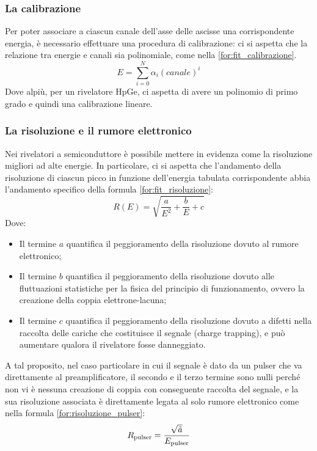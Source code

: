 \documentclass{article}
\begin{document}
            \subsubsection*{La calibrazione}
                Per poter associare a ciascun canale dell'asse delle ascisse una corrispondente energia, è necessario effettuare una procedura di calibrazione: ci si aspetta che la relazione tra energie e canali sia polinomiale, come nella \eqref{for:fit_calibrazione}.
                \begin{equation}\label{for:fit_calibrazione}
                    E=\sum_{i=0}^{N} \alpha_i(canale)^i
                \end{equation}
                Dove alpiù, per un rivelatore HpGe, ci aspetta di avere un polinomio di primo grado e quindi una calibrazione lineare.
                
            \subsubsection*{La risoluzione e il rumore elettronico}
                Nei rivelatori a semiconduttore è possibile mettere in evidenza come la risoluzione migliori ad alte energie. In particolare, ci si aspetta che l'andamento della risoluzione di ciascun picco in funzione dell'energia tabulata corrispondente abbia l'andamento specifico della formula \eqref{for:fit_risoluzione}:
                \begin{equation}\label{for:fit_risoluzione}
                    R(E)=\sqrt{\frac{a}{E^2}+\frac{b}{E}+c}
                \end{equation}
                Dove:
                \begin{itemize}
                    \item Il termine $a$ quantifica il peggioramento della risoluzione dovuto al rumore elettronico;
                    \item Il termine $b$ quantifica il peggioramento della risoluzione dovuto alle fluttuazioni statistiche per la fisica del principio di funzionamento, ovvero la creazione della coppia elettrone-lacuna;
                    \item Il termine $c$ quantifica il peggioramento della risoluzione dovuto a difetti nella raccolta delle cariche che costituisce il segnale (charge trapping), e può aumentare qualora il rivelatore fosse danneggiato.
                \end{itemize}

                A tal proposito, nel caso particolare in cui il segnale è dato da un pulser che va direttamente al preamplificatore, il secondo e il terzo termine sono nulli perché non vi è nessuna creazione di coppia con conseguente raccolta del segnale, e la sua risoluzione associata è direttamente legata al solo rumore elettronico come nella formula \eqref{for:risoluzione_pulser}:
                \begin{equation}\label{for:risoluzione_pulser}
                    R_{\text{pulser}}=\frac{\sqrt{\Tilde{a}}}{E_{\text{pulser}}}
                \end{equation}
\end{document}
